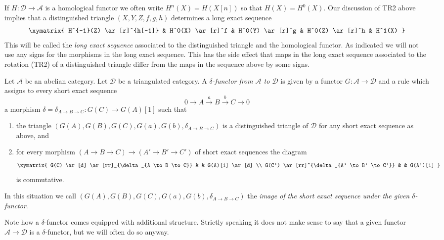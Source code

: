 \noindent
If $H : \mathcal{D} \to \mathcal{A}$ is a homological functor
we often write $H^n(X) = H(X[n])$ so that $H(X) = H^0(X)$.
Our discussion of TR2 above implies that a distinguished triangle
$(X, Y, Z, f, g, h)$ determines a long exact sequence
\begin{equation}
\label{equation-long-exact-cohomology-sequence}
\xymatrix{
H^{-1}(Z) \ar[r]^{h[-1]} &
H^0(X) \ar[r]^f &
H^0(Y) \ar[r]^g &
H^0(Z) \ar[r]^h &
H^1(X)
}
\end{equation}
This will be called the {\it long exact sequence} associated to the
distinguished triangle and the homological functor. As indicated
we will not use any signs for the morphisms in the long exact
sequence. This has the side effect that maps in the long exact sequence
associated to the rotation (TR2) of a distinguished triangle differ
from the maps in the sequence above by some signs.

\begin{definition}
\label{definition-delta-functor}
Let $\mathcal{A}$ be an abelian category.
Let $\mathcal{D}$ be a triangulated category.
A {\it $\delta$-functor from $\mathcal{A}$ to $\mathcal{D}$} is
given by a functor $G : \mathcal{A} \to \mathcal{D}$ and
a rule which assigns to every short exact sequence
$$
0 \to A \xrightarrow{a} B \xrightarrow{b} C \to 0
$$
a morphism $\delta = \delta_{A \to B \to C} : G(C) \to G(A)[1]$
such that
\begin{enumerate}
\item the triangle
$(G(A), G(B), G(C), G(a), G(b), \delta_{A \to B \to C})$
is a distinguished triangle of $\mathcal{D}$
for any short exact sequence as above, and
\item for every morphism $(A \to B \to C) \to (A' \to B' \to C')$
of short exact sequences the diagram
$$
\xymatrix{
G(C) \ar[d] \ar[rr]_{\delta_{A \to B \to C}} & &
G(A)[1] \ar[d] \\
G(C') \ar[rr]^{\delta_{A' \to B' \to C'}} & &
G(A')[1]
}
$$
is commutative.
\end{enumerate}
In this situation we call
$(G(A), G(B), G(C), G(a), G(b), \delta_{A \to B \to C})$
the {\it image of the short exact sequence under the
given $\delta$-functor}.
\end{definition}

\noindent
Note how a $\delta$-functor comes equipped with additional structure.
Strictly speaking it does not make sense to say that a given
functor $\mathcal{A} \to \mathcal{D}$ is a $\delta$-functor, but we
will often do so anyway.












